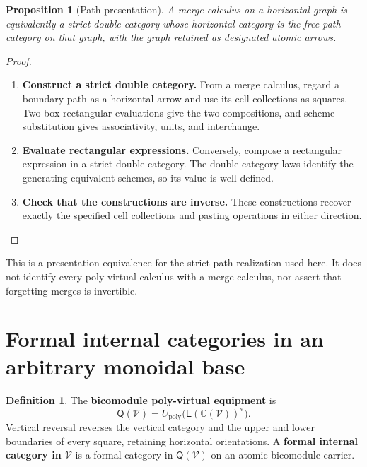 \documentclass[11pt,reqno]{amsart}
\theoremstyle{plain}
\newtheorem{proposition}[theorem]{Proposition}
\theoremstyle{definition}
\newtheorem{definition}[theorem]{Definition}
\theoremstyle{remark}
\numberwithin{equation}{section}
\newcommand{\V}{\mathcal V}
\newcommand{\E}{\mathsf E}
\newcommand{\Q}{\mathsf Q}
\newcommand{\Ccal}{\mathbb C}
\newcommand{\Up}{U_{\mathrm{poly}}}
\newcommand{\vop}{\mathrm v}
\begin{document}
\begin{proposition}[Path presentation]\label{prop:pathpresentation}
A merge calculus on a horizontal graph is equivalently a strict double
category whose horizontal category is the free path category on that
graph, with the graph retained as designated atomic arrows.
\end{proposition}
\begin{proof}\leavevmode
\begin{enumerate}
\item \textbf{Construct a strict double category.} From a merge calculus, regard a boundary path as a horizontal arrow and
use its cell collections as squares. Two-box rectangular evaluations
give the two compositions, and scheme substitution gives associativity,
units, and interchange.

\item \textbf{Evaluate rectangular expressions.} Conversely, compose a rectangular expression
in a strict double category. The double-category laws identify the
generating equivalent schemes, so its value is well defined.

\item \textbf{Check that the constructions are inverse.} These
constructions recover exactly the specified cell collections and pasting
operations in either direction.\qedhere
\end{enumerate}
\end{proof}

This is a presentation equivalence for the strict path realization used
here. It does not identify every poly-virtual calculus with a merge
calculus, nor assert that forgetting merges is invertible.

\section{Formal internal categories in an arbitrary monoidal base}\label{sec:formalinternal}

\begin{definition}\label{def:Q}
The \textbf{bicomodule poly-virtual equipment} is
\begin{equation}\label{eq:Q}
 \Q(\V)=\Up\bigl(\E(\Ccal(\V))^{\vop}\bigr).
\end{equation}
Vertical reversal reverses the vertical category and the upper and
lower boundaries of every square, retaining horizontal orientations.
A \textbf{formal internal category in $\V$} is a formal category in
$\Q(\V)$ on an atomic bicomodule carrier.
\end{definition}
\end{document}
